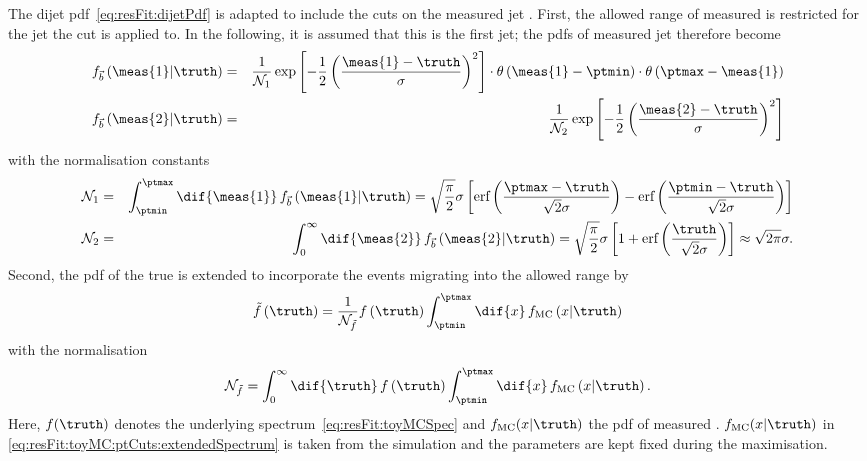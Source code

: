 \documentclass[a4paper]{cmspaper} %
\begin{document}
The dijet pdf~\eqref{eq:resFit:dijetPdf} is adapted to include the cuts on the measured jet \pt.
First, the allowed range of measured \pt is restricted for the jet the \pt cut is applied to.
In the following, it is assumed that this is the first jet; the pdfs of measured jet \pt therefore become
\begin{eqnarray*}
  f_{\vec{b}}\left(\meas{1}|\truth\right) & = & 
  \frac{1}{\mathcal{N}_{1}}\exp\left[-\frac{1}{2}\left(\frac{\meas{1}
        - \truth}{\sigma}\right)^{2}\right]
  \cdot\theta\left(\meas{1} - \ptmin\right)
  \cdot\theta\left(\ptmax - \meas{1}\right) \\
  f_{\vec{b}}\left(\meas{2}|\truth\right) & = & 
  \frac{1}{\mathcal{N}_{2}}\exp\left[-\frac{1}{2}\left(\frac{\meas{2}
        - \truth}{\sigma}\right)^{2}\right] \\
\end{eqnarray*}
with the normalisation constants
\begin{eqnarray*}
  \mathcal{N}_{1} & = &
  \int^{\ptmax}_{\ptmin}\dif{\meas{1}}\,f_{\vec{b}}\left(\meas{1}|\truth\right)
  = \sqrt{\frac{\pi}{2}}\sigma \left[ \text{erf}\left(\frac{\ptmax -
        \truth}{\sqrt{2}\sigma}\right) - \text{erf}\left(\frac{\ptmin
        - \truth}{\sqrt{2}\sigma}\right)\right] \\
  \mathcal{N}_{2} & = &
  \int^{\infty}_{0}\dif{\meas{2}}\,f_{\vec{b}}\left(\meas{2}|\truth\right)
  = \sqrt{\frac{\pi}{2}}\sigma \left[ 1 +
    \text{erf}\left(\frac{\truth}{\sqrt{2}\sigma}\right)\right]
  \approx \sqrt{2\pi}\sigma.
\end{eqnarray*}
Second, the pdf of the true \pt is extended to incorporate the events
migrating into the allowed \pt range by
\begin{equation}
  \label{eq:resFit:toyMC:ptCuts:extendedSpectrum}
  \tilde{f}\left(\truth\right) = \frac{1}{\mathcal{N}_{\tilde{f}}}
  f\left(\truth\right) \int^{\ptmax}_{\ptmin}\dif{x}\,f_{\text{MC}}\left(x|\truth\right)
\end{equation}
with the normalisation
\begin{equation*}
  \mathcal{N}_{\tilde{f}} = \int^{\infty}_{0}\dif{\truth}\,
  f\left(\truth\right) \int^{\ptmax}_{\ptmin}\dif{x}\,f_{\text{MC}}\left(x|\truth\right).
\end{equation*}
Here, $f(\truth)$ denotes the underlying spectrum~\eqref{eq:resFit:toyMCSpec} and
$f_{\text{MC}}(x|\truth)$ the pdf of measured \pt.
$f_{\text{MC}}(x|\truth)$ in \eqref{eq:resFit:toyMC:ptCuts:extendedSpectrum} is taken from the
simulation and the parameters are kept fixed during the maximisation.
\end{document}
